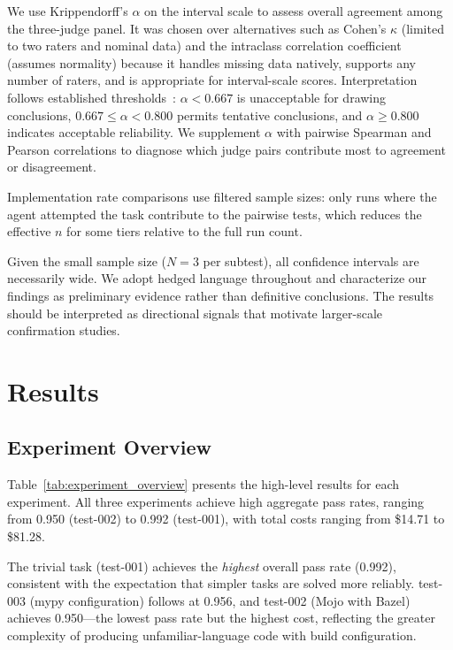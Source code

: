 \documentclass[11pt]{article}
\begin{document}
We use Krippendorff's $\alpha$ on the interval scale to assess overall
agreement among the three-judge panel. It was chosen over alternatives such as
Cohen's $\kappa$ (limited to two raters and nominal data) and the intraclass
correlation coefficient (assumes normality) because it handles missing data
natively, supports any number of raters, and is appropriate for interval-scale
scores. Interpretation follows established thresholds~\cite{krippendorff2004content}:
$\alpha < 0.667$ is unacceptable for drawing conclusions, $0.667 \leq \alpha
< 0.800$ permits tentative conclusions, and $\alpha \geq 0.800$ indicates
acceptable reliability. We supplement $\alpha$ with pairwise Spearman and
Pearson correlations to diagnose which judge pairs contribute most to
agreement or disagreement.

Implementation rate comparisons use filtered sample sizes: only runs where the
agent attempted the task contribute to the pairwise tests, which reduces the
effective $n$ for some tiers relative to the full run count.

Given the small sample size ($N=3$ per subtest), all confidence intervals are
necessarily wide. We adopt hedged language throughout and characterize our
findings as preliminary evidence rather than definitive conclusions. The
results should be interpreted as directional signals that motivate
larger-scale confirmation studies.

\section{Results}
\label{sec:results}

\subsection{Experiment Overview}
\label{sec:experiment_overview}

Table~\ref{tab:experiment_overview} presents the high-level results for each
experiment. All three experiments achieve high aggregate pass rates, ranging
from 0.950 (test-002) to 0.992 (test-001), with total costs ranging from
\$14.71 to \$81.28.



The trivial task (test-001) achieves the \emph{highest} overall pass rate
(0.992), consistent with the expectation that simpler tasks are solved more
reliably. test-003 (mypy configuration) follows at 0.956, and test-002 (Mojo
with Bazel) achieves 0.950---the lowest pass rate but the highest cost,
reflecting the greater complexity of producing unfamiliar-language code with
build configuration.
\end{document}
